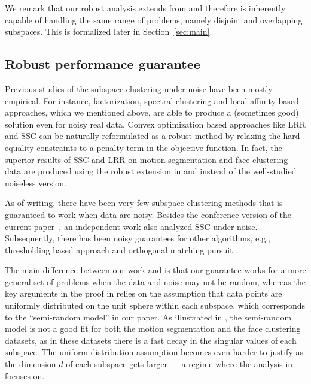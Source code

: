 \documentclass{ctexart}
\begin{document}
We remark that our robust analysis extends from \cite{soltanolkotabi2011geometric} and therefore is inherently capable of handling the same range of problems, namely disjoint and overlapping subspaces. This is formalized later in Section~\ref{sec:main}.

\subsection{Robust performance guarantee}

Previous studies of the subspace clustering under noise have been mostly empirical. For instance, factorization, spectral clustering and local affinity based approaches, which we mentioned above, are able to produce a (sometimes good) solution even for noisy real data. Convex optimization based approaches like LRR and SSC can be naturally reformulated as a robust method by relaxing the hard equality constraints to a penalty term in the objective function. In fact, the superior results of SSC and LRR on motion segmentation and face clustering data are produced using the robust extension in \cite{elhamifar2009ssc} and \cite{liu2010lrr_icml} instead of the well-studied noiseless version.

As of writing, there have been very few subspace clustering methods that is guaranteed to work when data are noisy.  Besides the conference version of the current paper~\cite{wang2013noisy}, an independent work \cite{soltanolkotabi2013robust} also analyzed SSC under noise. Subsequently, there has been noisy guarantees for other algorithms, e.g., thresholding based approach \cite{heckel2013noisy} and
orthogonal matching pursuit \cite{dyer2013greedy}.

The main difference between our work and \cite{soltanolkotabi2013robust} is that our guarantee works for a more general set of problems when the data and noise may not be random, whereas the key arguments in the proof in \cite{soltanolkotabi2013robust} relies on the assumption that data points are uniformly distributed on the unit sphere within each subspace, which corresponds to the ``semi-random model'' in our paper.
As illustrated in \cite[Figure~9~and~10]{elhamifar2012ssc_journal}, the semi-random model is not a good fit for both the motion segmentation and the face clustering datasets, as in these datasets there is a fast decay in the singular values of each subspace.  The uniform distribution assumption becomes even harder to justify as the dimension $d$ of each subspace gets larger --- a regime where the analysis in \cite{soltanolkotabi2013robust} focuses on.
\end{document}
